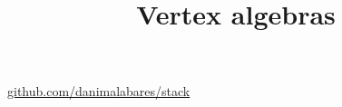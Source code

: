 



\title{Vertex algebras}
\maketitle

\label{section-phantom}
\hfill
\href{http://github.com/danimalabares/stack}{github.com/danimalabares/stack}

\tableofcontents









